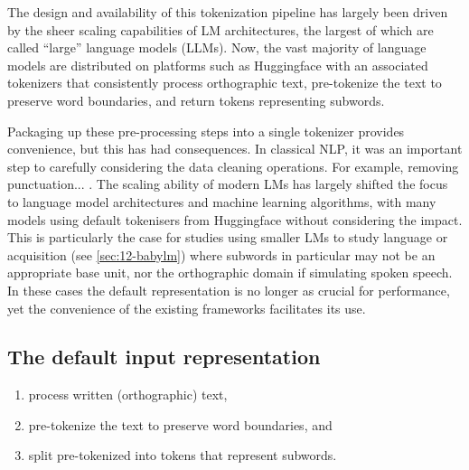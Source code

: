 The design and availability of this tokenization pipeline has largely been driven by the sheer scaling capabilities of LM architectures, the largest of which are called ``large'' language models (LLMs). Now, the vast majority of language models are distributed on platforms such as Huggingface with an associated tokenizers that consistently process orthographic text, pre-tokenize the text to preserve word boundaries, and return tokens representing subwords.

Packaging up these pre-processing steps into a single tokenizer provides convenience, but this has had consequences. In classical NLP, it was an important step to carefully considering the data cleaning operations. For example, removing punctuation... \writemore. The scaling ability of modern LMs has largely shifted the focus to language model architectures and machine learning algorithms, with many models using default tokenisers from Huggingface without considering the impact. This is particularly the case for studies using smaller LMs to study language or acquisition (see \cref{sec:12-babylm}) where subwords in particular may not be an appropriate base unit, nor the orthographic domain if simulating spoken speech. In these cases the default representation is no longer as crucial for performance, yet the convenience of the existing frameworks facilitates its use. 

\subsection{The default input representation}\label{sec:12-default}




\begin{enumerate}
    \item process written (orthographic) text,
    \item pre-tokenize the text to preserve word boundaries, and
    \item split pre-tokenized into tokens that represent subwords.
\end{enumerate}


